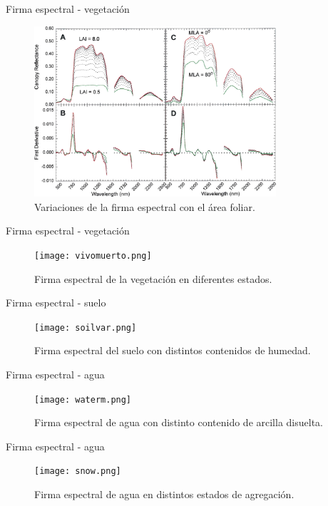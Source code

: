 \documentclass[]{beamer}
\begin{document}
\begin{frame}{Firma espectral - vegetación}
  \begin{figure}

  \includegraphics[width=0.8\textwidth]{leafvar.png}
  \caption{Variaciones de la firma espectral con el área foliar.}
  \end{figure}
\end{frame}

\begin{frame}{Firma espectral - vegetación}
    \begin{figure}

    \texttt{[image: vivomuerto.png]}
    \caption{Firma espectral de la vegetación en diferentes estados.}
    \end{figure}
\end{frame}

\begin{frame}{Firma espectral - suelo}
    \begin{figure}

    \texttt{[image: soilvar.png]}
    \caption{Firma espectral del suelo con distintos contenidos de humedad.}
    \end{figure}
\end{frame}

\begin{frame}{Firma espectral - agua}
    \begin{figure}

    \texttt{[image: waterm.png]}
    \caption{Firma espectral de agua con distinto contenido de arcilla disuelta.}
    \end{figure}
\end{frame}

\begin{frame}{Firma espectral - agua}
    \begin{figure}
    \texttt{[image: snow.png]}
    \caption{Firma espectral de agua en distintos estados de agregación.}
    \end{figure}
\end{frame}
\end{document}
